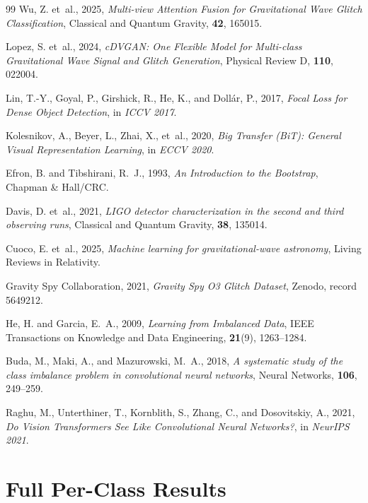 \documentclass[12pt]{article}
\begin{document}
\begin{thebibliography}{99}
Wu, Z. et~al., 2025,
\emph{Multi-view Attention Fusion for Gravitational Wave Glitch Classification},
Classical and Quantum Gravity, \textbf{42}, 165015.

Lopez, S. et~al., 2024,
\emph{cDVGAN: One Flexible Model for Multi-class Gravitational Wave Signal and Glitch Generation},
Physical Review D, \textbf{110}, 022004.

Lin, T.-Y., Goyal, P., Girshick, R., He, K., and Doll{\'a}r, P., 2017,
\emph{Focal Loss for Dense Object Detection},
in \emph{ICCV 2017}.

Kolesnikov, A., Beyer, L., Zhai, X., et~al., 2020,
\emph{Big Transfer (BiT): General Visual Representation Learning},
in \emph{ECCV 2020}.

Efron, B. and Tibshirani, R.~J., 1993,
\emph{An Introduction to the Bootstrap},
Chapman \& Hall/CRC.

Davis, D. et~al., 2021,
\emph{LIGO detector characterization in the second and third observing runs},
Classical and Quantum Gravity, \textbf{38}, 135014.

Cuoco, E. et~al., 2025,
\emph{Machine learning for gravitational-wave astronomy},
Living Reviews in Relativity.

Gravity Spy Collaboration, 2021,
\emph{Gravity Spy O3 Glitch Dataset},
Zenodo, record 5649212.

He, H. and Garcia, E.~A., 2009,
\emph{Learning from Imbalanced Data},
IEEE Transactions on Knowledge and Data Engineering, \textbf{21}(9), 1263--1284.

Buda, M., Maki, A., and Mazurowski, M.~A., 2018,
\emph{A systematic study of the class imbalance problem in convolutional neural networks},
Neural Networks, \textbf{106}, 249--259.

Raghu, M., Unterthiner, T., Kornblith, S., Zhang, C., and Dosovitskiy, A., 2021,
\emph{Do Vision Transformers See Like Convolutional Neural Networks?},
in \emph{NeurIPS 2021}.

\end{thebibliography}

\clearpage
\appendix
\section{Full Per-Class Results}
\label{app:perclass}


\end{document}

